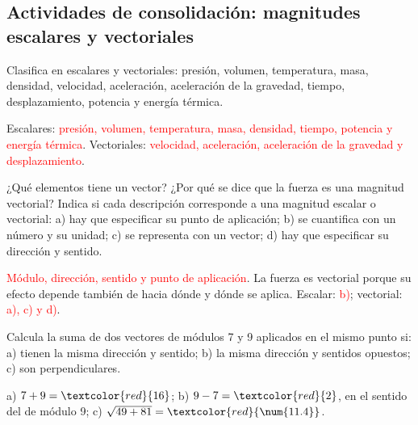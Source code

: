 \subsection*{Actividades de consolidación: magnitudes escalares y vectoriales}

\begin{exercise}
    Clasifica en escalares y vectoriales: presión, volumen, temperatura, masa, densidad, velocidad, aceleración, aceleración de la gravedad, tiempo, desplazamiento, potencia y energía térmica.
    \begin{solu}
        Escalares: \textcolor{red}{presión, volumen, temperatura, masa, densidad, tiempo, potencia y energía térmica}. Vectoriales: \textcolor{red}{velocidad, aceleración, aceleración de la gravedad y desplazamiento}.
    \end{solu}
\end{exercise}

\begin{exercise}
    ¿Qué elementos tiene un vector? ¿Por qué se dice que la fuerza es una magnitud vectorial? Indica si cada descripción corresponde a una magnitud escalar o vectorial: a) hay que especificar su punto de aplicación; b) se cuantifica con un número y su unidad; c) se representa con un vector; d) hay que especificar su dirección y sentido.
    \begin{solu}
        \textcolor{red}{Módulo, dirección, sentido y punto de aplicación}. La fuerza es vectorial porque su efecto depende también de hacia dónde y dónde se aplica. Escalar: \textcolor{red}{b)}; vectorial: \textcolor{red}{a), c) y d)}.
    \end{solu}
\end{exercise}

\begin{exercise}
    Calcula la suma de dos vectores de módulos 7 y 9 aplicados en el mismo punto si: a) tienen la misma dirección y sentido; b) la misma dirección y sentidos opuestos; c) son perpendiculares.
    \begin{solu}
        a) \(7 + 9 = \textcolor{red}{16}\); b) \(9 - 7 = \textcolor{red}{2}\), en el sentido del de módulo 9; c) \(\sqrt{49 + 81} = \textcolor{red}{\num{11.4}}\).
    \end{solu}
\end{exercise}

